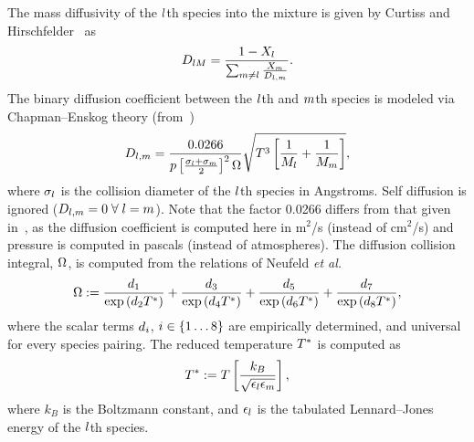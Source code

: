 The mass diffusivity of the $l$th species into the mixture is given by Curtiss and Hirschfelder~\cite{Curtiss1949} as
%
\begin{equation}\label{eq:curtissAvgDiff}
	D_{l M} = \frac{1 - X_{l}}{\sum_{m \neq l} \frac{X_{m}}{D_{l, m}}}.
\end{equation}
%
The binary diffusion coefficient between the $l$th and $m$th species is modeled via Chapman--Enskog theory (from~\cite{propGasLiquid})
%
\begin{equation}
	D_{l, m} = \frac{0.0266}{p \left[\frac{\sigma_{l} + \sigma_{m}}{2}\right]^2 \Omega} \sqrt{T^3 \left[\frac{1}{M_{l}} + \frac{1}{M_{m}}\right]},
\end{equation}
%
where $\sigma_{l}$ is the collision diameter of the $l$th species in Angstroms. Self diffusion is ignored ($D_{l, m} = 0 \; \forall \; l = m$). Note that the factor 0.0266 differs from that given in~\cite{propGasLiquid}, as the diffusion coefficient is computed here in m$^2$/s (instead of cm$^2$/s) and pressure is computed in pascals (instead of atmospheres). The diffusion collision integral, $\Omega$, is computed from the relations of Neufeld \textit{et al.}~\cite{Neufeld1972}
%
\begin{equation}
	\Omega := \frac{d_{1}}{\text{exp} \left(d_{2} T^*\right)} + \frac{d_{3}}{\text{exp} \left(d_{4} T^*\right)} + \frac{d_{5}}{\text{exp} \left(d_{6} T^*\right)} + \frac{d_{7}}{\text{exp} \left(d_{8} T^*\right)},
\end{equation}
%
where the scalar terms $d_{i}$, $i \in \{1 \hdots 8\}$ are empirically determined, and universal for every species pairing. The reduced temperature $T^*$ is computed as
\begin{equation}
	T^* := T \left[ \frac{k_B}{\sqrt{\epsilon_{l} \epsilon_{m}}} \right],
\end{equation}
where $k_B$ is the Boltzmann constant, and $\epsilon_{l}$ is the tabulated Lennard--Jones energy of the $l$th species.


